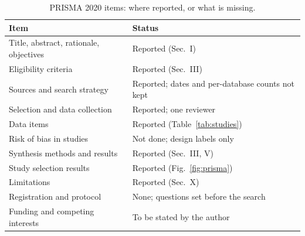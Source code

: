 \documentclass[conference]{IEEEtran}
\begin{document}
\begin{table}[h]
\centering
\caption{PRISMA 2020 items: where reported, or what is missing.}
\label{tab:prisma}
\footnotesize
\renewcommand{\arraystretch}{1.03}
\begin{tabularx}{\columnwidth}{@{}l X@{}}
\toprule
Item & Status \\
\midrule
Title, abstract, rationale, objectives & Reported (Sec.~I) \\
Eligibility criteria & Reported (Sec.~III) \\
Sources and search strategy & Reported; dates and per-database counts not kept \\
Selection and data collection & Reported; one reviewer \\
Data items & Reported (Table~\ref{tab:studies}) \\
Risk of bias in studies & Not done; design labels only \\
Synthesis methods and results & Reported (Sec.~III, V) \\
Study selection results & Reported (Fig.~\ref{fig:prisma}) \\
Limitations & Reported (Sec.~X) \\
Registration and protocol & None; questions set before the search \\
Funding and competing interests & To be stated by the author \\
\bottomrule
\end{tabularx}
\end{table}
\end{document}
